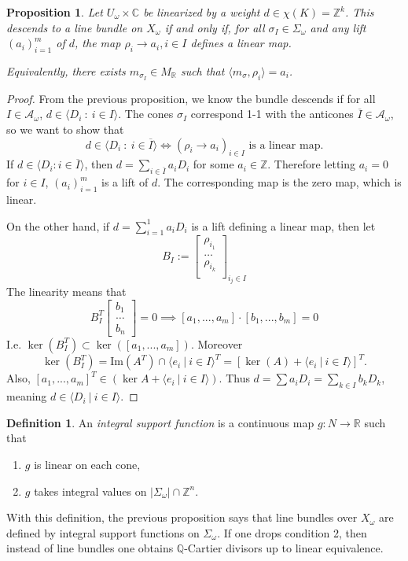 \documentclass{article}
\newtheorem{prop}[theorem]{Proposition}
\theoremstyle{definition}
\newtheorem{definition}[theorem]{Definition}
\theoremstyle{remark}
\numberwithin{theorem}{section}
\newcommand{\C}{\mathbb{C}}
\newcommand{\Z}{\mathbb{Z}}
\newcommand{\R}{\mathbb{R}}
\newcommand{\cA}{\mathcal{A}}
\begin{document}
	\begin{prop}
		Let $U_\omega\times \C$ be linearized by a weight $d\in \chi(K)=\Z^k$. This descends to a line bundle on $X_\omega$ if and only if, for all $\sigma_I\in\Sigma_\omega$ and any lift $(a_i)_{i=1}^m$ of $d$, the map $\rho_i\to a_i, i\in I$ defines a linear map. \vspace{1em}

		Equivalently, there exists $m_{\sigma_I} \in M_{\R}$ such that $\langle m_\sigma, \rho_i\rangle = a_i$. 
	\end{prop}
	\begin{proof}
		From the previous proposition, we know the bundle descends if for all $I\in \cA_\omega$, $d\in \langle D_i ~:~ i\in I\rangle$. The cones $\sigma_I$ correspond 1-1 with the anticones $\overline{I}\in \cA_\omega$, so we want to show that 
		$$d \in \langle D_i ~:~ i\in \overline{I} \rangle \iff (\rho_i\to a_i)_{i\in I} \text{ is a linear map.}$$
		If $d\in \langle D_i : i\in\overline{I}\rangle$,  then $d=\sum_{i\in \overline{I}} a_iD_i$ for some $a_i\in \Z$. Therefore letting $a_i = 0$ for $i\in I$, $(a_i)_{i=1}^m$ is a lift of $d$. The corresponding map is the zero map, which is linear. \vspace{1em}
		
		On the other hand, if $d=\sum_{i=1}^1 a_iD_i$ is a lift defining a linear map, then let 
		$$B_I := \begin{bmatrix}
			\rho_{i_1}\\
			\dots\\
			\rho_{i_k}\\
		\end{bmatrix}_{i_j\in I}$$
		The linearity means that
		$$B_I^T \begin{bmatrix}
			b_1\\
			\dots\\
			b_n
		\end{bmatrix}=0 \implies [a_1,...,a_m]\cdot[b_1,...,b_m]=0$$
		I.e. $\ker(B_I^T)\subset\ker([a_1,...,a_m])$. Moreover
		$$\ker(B_I^T) = \text{Im}(A^T) \cap \langle e_i ~|~ i\in I\rangle^T = [\ker(A)+\langle e_i ~|~ i\in I\rangle]^T .$$
		Also, $[a_1,...,a_m]^T \in (\ker A+\langle e_i ~|~ i\in I\rangle)$. Thus $d=\sum a_i D_i = \sum_{k\in I} b_kD_k$, meaning $d\in \langle D_i ~|~ i\in I\rangle$.
	\end{proof}
	\begin{definition}
		An \emph{integral support function} is a continuous map $g:N \to \R$ such that 
		\begin{enumerate}
			\item $g$ is linear on each cone,
			\item $g$ takes integral values on $|\Sigma_\omega|\cap \Z^n$.
		\end{enumerate}
	\end{definition}
	With this definition, the previous proposition says that line bundles over $X_\omega$ are defined by integral support functions on $\Sigma_\omega$. If one drops condition 2, then instead of line bundles one obtains $\mathbb{Q}$-Cartier divisors up to linear equivalence. \vspace{1em}
\end{document}

